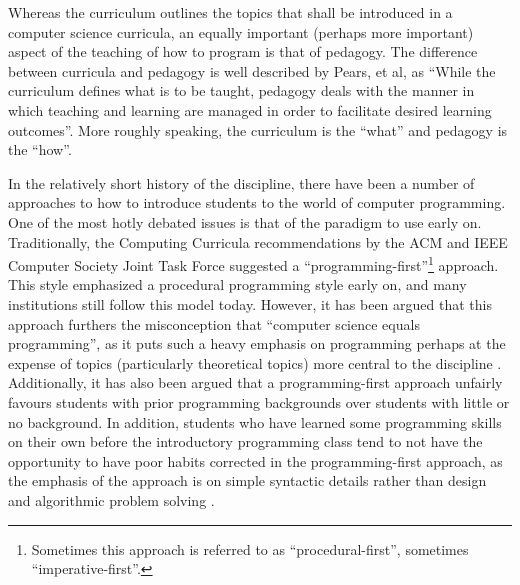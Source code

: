 Whereas the curriculum outlines the topics that shall be introduced in a computer science curricula, an equally important (perhaps more important) aspect of the teaching of how to program is that of pedagogy.  The difference between curricula and pedagogy is well described by Pears, et al, as ``While the curriculum defines what is to be taught, pedagogy deals with the manner in which teaching and learning are managed in order to facilitate desired learning outcomes''\cite{Pears07}.  More roughly speaking, the curriculum is the ``what'' and pedagogy is the ``how''.

In the relatively short history of the discipline, there have been a number of approaches to how to introduce students to the world of computer programming.  One of the most hotly debated issues is that of the paradigm to use early on.  Traditionally, the Computing Curricula recommendations by the ACM and IEEE Computer Society Joint Task Force suggested a ``programming-first''\footnote{Sometimes this approach is referred to as ``procedural-first'', sometimes ``imperative-first''.} approach.  This style emphasized a procedural programming style early on, and many institutions still follow this model today.  However, it has been argued that this approach furthers the misconception that ``computer science equals programming'', as it puts such a heavy emphasis on programming perhaps at the expense of topics (particularly theoretical topics) more central to the discipline \cite{cc2001}.  Additionally, it has also been argued that a programming-first approach unfairly favours students with prior programming backgrounds over students with little or no background.  In addition, students who have learned some programming skills on their own before the introductory programming class tend to not have the opportunity to have poor habits corrected in the programming-first approach, as the emphasis of the approach is on simple syntactic details rather than design and algorithmic problem solving \cite{cc2001}.

